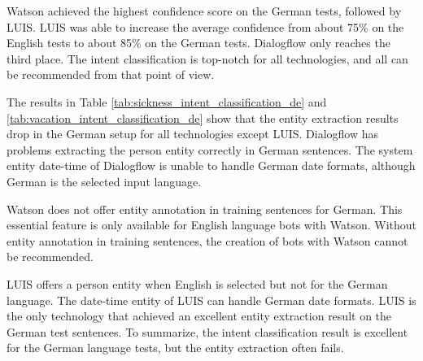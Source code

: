 Watson achieved the highest confidence score on the German tests, followed by LUIS.
LUIS was able to increase the average confidence from about 75\% on the English tests to about 85\% on the German tests.
Dialogflow only reaches the third place.
The intent classification is top-notch for all technologies, and all can be recommended from that point of view.

The results in Table \ref{tab:sickness_intent_classification_de} and \ref{tab:vacation_intent_classification_de} show that the entity extraction results drop in the German setup for all technologies except LUIS.
Dialogflow has problems extracting the person entity correctly in German sentences.
The system entity date-time of Dialogflow is unable to handle German date formats, although German is the selected input language.

Watson does not offer entity annotation in training sentences for German.
This essential feature is only available for English language bots with Watson.
Without entity annotation in training sentences, the creation of bots with Watson cannot be recommended.

LUIS offers a person entity when English is selected but not for the German language.
The date-time entity of LUIS can handle German date formats. 
LUIS is the only technology that achieved an excellent entity extraction result on the German test sentences.
To summarize, the intent classification result is excellent for the German language tests, but the entity extraction often fails.

